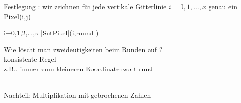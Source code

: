 \documentclass[11pt]{article}
\begin{document}
Festlegung : wir zeichnen für jede vertikale Gitterlinie $i=0,1,…,x$ genau ein Pixel(i,j)
\begin{minipage}[c]{14cm}
\begin{minipage}[c]{7cm}
\begin{program}
\FOR i=0,1,2,...,x
	|SetPixel|(i,round )
\end{program}
\end{minipage}
\hfill
\begin{minipage}[c]{7cm}
Wie löscht man zweideutigkeiten beim Runden auf ?\\
konsistente Regel\\
z.B.: immer zum kleineren Koordinatenwort rund
\end{minipage}
\end{minipage}\\
Nachteil: Multiplikation mit gebrochenen Zahlen
\end{document}
